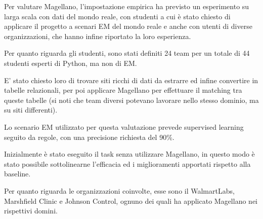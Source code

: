 Per valutare Magellano, l'impostazione empirica ha previsto un esperimento su larga scala con dati del mondo reale, con studenti a cui è stato chiesto di applicare il progetto a scenari EM del mondo reale e anche con utenti di diverse organizzazioni, che hanno infine riportato la loro esperienza. 

Per quanto riguarda gli studenti, sono stati definiti 24 team per un totale di 44 studenti esperti di Python, ma non di EM. 

E' stato chiesto loro di trovare siti ricchi di dati da estrarre ed infine convertire in tabelle relazionali, per poi applicare Magellano per effettuare il matching tra queste tabelle (si noti che team diversi potevano lavorare nello stesso dominio, ma su siti differenti). 

Lo scenario EM utilizzato per questa valutazione prevede supervised learning seguito da regole, con una precisione richiesta del 90\%. 

Inizialmente è stato eseguito il task senza utilizzare Magellano, in questo modo è stato possibile sottolinearne l'efficacia ed i miglioramenti apportati rispetto alla baseline.

Per quanto riguarda le organizzazioni coinvolte, esse sono il WalmartLabs, Marshfield Clinic e Johnson Control, ognuno dei quali ha applicato Magellano nei rispettivi domini.

